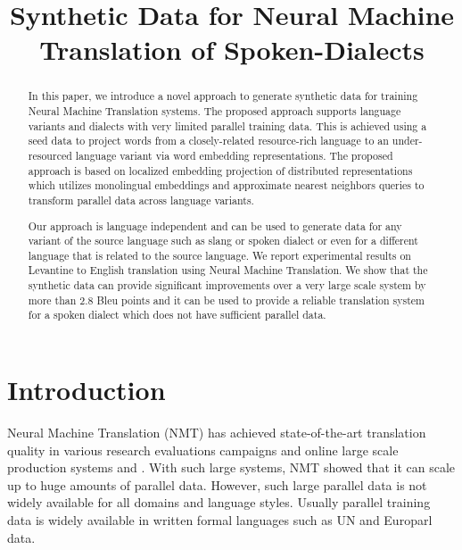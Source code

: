 \documentclass[a4paper]{article}
\title{Synthetic  Data  for Neural Machine Translation of Spoken-Dialects}
\begin{document}
\maketitle
%

\maketitle

\begin{abstract}
 

	
	In this paper,  we introduce a novel approach to generate synthetic data for  training  Neural Machine Translation systems. The proposed approach supports language variants and dialects with very limited parallel training data. This is achieved using a seed data to project words  from a closely-related resource-rich language to an under-resourced language variant  via word embedding representations. The proposed approach is based on localized  embedding projection of distributed representations which utilizes monolingual embeddings and approximate nearest neighbors queries to transform parallel data across language variants.  
	
	Our approach is language independent and can be used to generate data for any variant of the source language such as slang or  spoken dialect  or even for a different language that is  related to the source language. We report experimental results on Levantine  to English translation using Neural Machine Translation. We show that the synthetic data can provide significant improvements over  a very large scale system by more than 2.8 Bleu points and it can be used to provide a reliable translation system for a spoken dialect which  does not have sufficient parallel data.



\end{abstract}


\section{Introduction}

Neural Machine Translation (NMT) \cite{BahdanauCB14} has achieved state-of-the-art translation quality  in various research  evaluations campaigns \cite{SennrichHB16a} and online large scale production systems \cite{WuSCLNMKCGMKSJL16} and \cite{jacob}. With such large systems,  NMT  showed  that it can scale up to huge amounts of parallel data. However, such large parallel data is not widely available for all domains and language styles. Usually parallel training data is widely available in written formal languages such as UN and Europarl data. 
\end{document}
